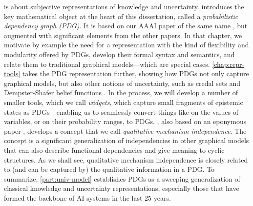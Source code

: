 \textbf{}
 is about subjective representations of knowledge and uncertainty. 
%
 introduces the key mathematical object at the heart of this dissertation, called a \emph{probabilistic dependency graph (PDG)}. 
It is based on our AAAI paper of the same name \citep{pdg-aaai}, but augmented with significant elements from the other papers. 
In that chapter, we motivate by example the need for a representation with the kind of flexibility and modularity offered by PDGs, develop their formal syntax and semantics, and relate them to traditional graphical models---which are special cases. 
%
\cref{chap:repr-tools} takes the PDG representation further, showing how PDGs not only capture graphical models, but also other notions of uncertainty, such as credal sets \citep{Walley1991-SRIP} and Dempster-Shafer belief functions \citep{shafer1976mathematical}.  
In the process, we will develop a number of smaller tools, which we call \emph{widgets}, which capture small fragments of epistemic states as PDGs---enabling us to seamlessly convert things like on the values of variables, or on their probability ranges, to PDGs.
,
    also based on 
    an eponymous paper \citep*{qim},
    develops a concept that we call \emph{qualitative mechanism independence}.
The concept is a significant generalization of independencies in other graphical models that can also describe functional dependencies and give meaning to cyclic structures. 
As we shall see, qualitative mechanism independence is closely related to (and can be captured by) the qualitative information in a PDG.
%
To summarize, \cref{part:univ-model} establishes PDGs as a sweeping generalization of classical knowledge and uncertainty representations, especially those that have formed the backbone of AI systems in the last 25 years. 


